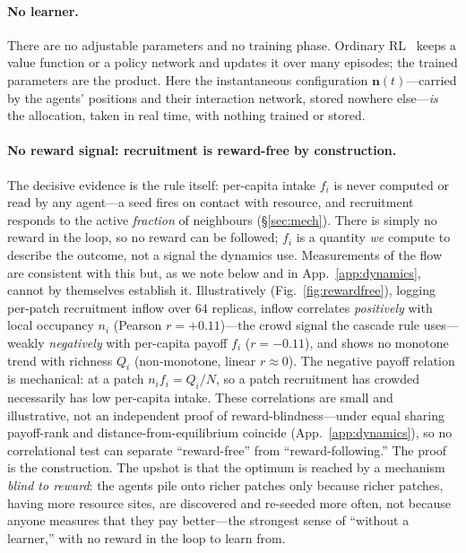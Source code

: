 \documentclass{article}
\begin{document}
\paragraph{No learner.} There are no adjustable parameters and no training phase. Ordinary
RL~\citep{SuttonBarto2018} keeps a value function or a policy network and updates it over many episodes; the
trained parameters are the product. Here the instantaneous configuration $\mathbf n(t)$---carried by the
agents' positions and their interaction network, stored nowhere else---\emph{is} the allocation, taken in real
time, with nothing trained or stored.

\paragraph{No reward signal: recruitment is reward-free by construction.} The decisive evidence is the rule
itself: per-capita intake $f_i$ is never computed or read by any agent---a seed fires on contact with resource,
and recruitment responds to the active \emph{fraction} of neighbours (\S\ref{sec:mech}). There is simply no
reward in the loop, so no reward can be followed; $f_i$ is a quantity \emph{we} compute to describe the
outcome, not a signal the dynamics use. Measurements of the flow are consistent with this but, as we note
below and in App.~\ref{app:dynamics}, cannot by themselves establish it. Illustratively (Fig.~\ref{fig:rewardfree}),
logging per-patch recruitment inflow over $64$ replicas, inflow correlates \emph{positively} with local
occupancy $n_i$ (Pearson $r=+0.11$)---the crowd signal the cascade rule uses---weakly \emph{negatively} with
per-capita payoff $f_i$ ($r=-0.11$), and shows no monotone trend with richness $Q_i$ (non-monotone, linear
$r\approx0$). The negative payoff relation is mechanical: at a patch $n_i f_i=Q_i/N$, so a patch recruitment
has crowded necessarily has low per-capita intake. These correlations are small and illustrative, not an
independent proof of reward-blindness---under equal sharing payoff-rank and distance-from-equilibrium coincide
(App.~\ref{app:dynamics}), so no correlational test can separate ``reward-free'' from ``reward-following.'' The
proof is the construction. The upshot is that the optimum is reached by a mechanism \emph{blind to reward}: the
agents pile onto richer patches only because richer patches, having more resource sites, are discovered and
re-seeded more often, not because anyone measures that they pay better---the strongest sense of ``without a
learner,'' with no reward in the loop to learn from.
\end{document}
